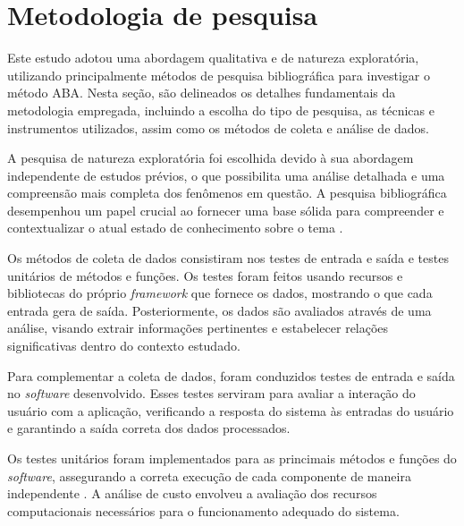 \chapter{Metodologia de pesquisa}\label{cap:metodologia}

Este estudo adotou uma abordagem qualitativa e de natureza exploratória, 
utilizando principalmente métodos de pesquisa bibliográfica para investigar o método ABA. 
Nesta seção, são delineados os detalhes fundamentais da metodologia empregada, 
incluindo a escolha do tipo de pesquisa, as técnicas e instrumentos utilizados, 
assim como os métodos de coleta e análise de dados.

A pesquisa de natureza exploratória foi escolhida devido à sua abordagem independente de estudos prévios, 
o que possibilita uma análise detalhada e uma compreensão mais completa dos fenômenos em questão. 
A pesquisa bibliográfica desempenhou um papel crucial ao fornecer uma base sólida para compreender e 
contextualizar o atual estado de conhecimento sobre o tema \cite{casula2021potential}.

Os métodos de coleta de dados consistiram nos testes de entrada e saída e testes unitários de métodos e funções. 
Os testes foram feitos usando recursos e bibliotecas do próprio 
\textit{framework} que fornece os dados, mostrando o que cada entrada gera de saída. 
Posteriormente, os dados são avaliados através de uma análise, 
visando extrair informações pertinentes e estabelecer relações significativas dentro do contexto estudado.

Para complementar a coleta de dados, foram conduzidos testes de entrada e saída no \textit{software} desenvolvido. 
Esses testes serviram para avaliar a interação do usuário com a aplicação, 
verificando a resposta do sistema às entradas do usuário e garantindo a saída correta dos dados processados.

Os testes unitários foram implementados para as princimais métodos e funções do \textit{software}, 
assegurando a correta execução de cada componente de maneira independente \cite{neto2007introduccao}. 
A análise de custo envolveu a avaliação dos recursos computacionais necessários para o funcionamento adequado do sistema.


